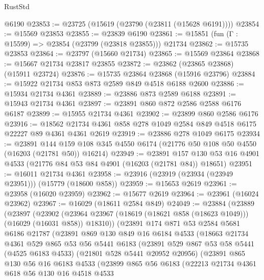 \begin{lexlean}{RustStd}
\begin{coremodule}
    @6190
@23853 := @23725 (@15619 (@23790 (@23811 (@15628 @6191))))
@23854 := @15569 @23853
@23855 := @23839 @6190
@23861 := @15851 (fun (Γ : @15599) => @23854 (@23799 (@23818 @23855))) @21734
@23862 := @15735 @23853
@23864 := @23797 (@15660 @21734)
@23865 := @15569 @23864
@23868 := @15667 @21734 @23817 @23855
@23872 := @23862 (@23865 @23868) (@15911 @23724)
@23876 := @15735 @23864 @23868 (@15916 @23796)
@23884 := @15922 @21734 @853 @873 @2589 @849 @4518 @6188 @2600
@23886 := @15934 @21734 @4361
@23889 := @23886 @873 @2589 @6188
@23891 := @15943 @21734 @4361
@23897 := @23891 @860 @872 @2586 @2588 @6176 @6187
@23899 := @15955 @21734 @4361
@23902 := @23899 @860 @2586 @6176
@23916 := @18562 @21734 @4361 @858 @278 @1049 @2584 @849 @4518 @6175 @22227 @89 @4361 @4361 @2619
@23919 := @23886 @278 @1049 @6175
@23934 := @23891
    @144
    @159
    @108
    @345
    @4550
    @6174
    (@21776 @50 @108 @50 @4550 (@16203 (@21781 @50)) @16214)
@23949 := @23891
    @157
    @130
    @53
    @16
    @4901
    @4533
    (@21776 @84 @53 @84 @4901 (@16203 (@21781 @84)) @18651)
@23951 := @16011 @21734 @4361
@23958 := @23916 (@23919 (@23934 (@23949 @23951))) (@15779 (@18600 @858))
@23959 := @15653 @2619
@23961 := @23958 (@16020 @23959)
@23962 := @15677 @2619
@23964 := @23961 (@16024 @23962)
@23967 := @16029 (@18611 @2584 @849)
@24049 := @23884
    (@23889
      (@23897
        (@23902 (@23964 @23967 (@18619 (@18621 @858 (@18623 @1049))) (@16029 (@16031 @858)) @18310))
        (@23891
          @174
          @871
          @53
          @2584
          @5681
          @6186
          @21787
          (@23891
            @869
            @130
            @849
            @16
            @6184
            @4533
            (@18663
              @21734
              @4361
              @529
              @865
              @53
              @56
              @5441
              @6183
              (@23891
                @529
                @867
                @53
                @58
                @5441
                (@4525 @6183 @4533)
                (@21801 @528 @5441 @20952 @20956)
                (@23891
                  @865
                  @130
                  @56
                  @16
                  @6183
                  @4533
                  (@23899
                    @865
                    @56
                    @6183
                    (@22213
                      @21734
                      @4361
                      @618
                      @56
                      @130
                      @16
                      @4518
                      @4533

\end{coremodule}
\end{lexlean}
